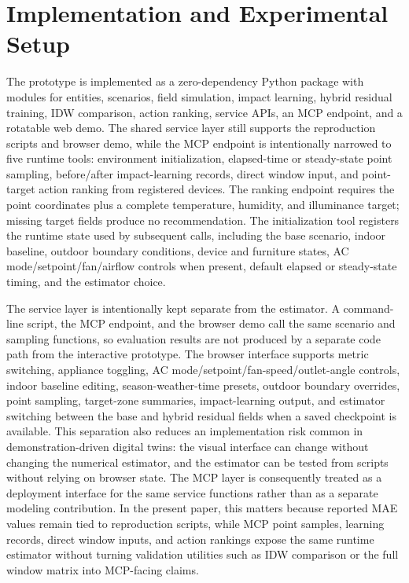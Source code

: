 \documentclass[conference,a4paper]{IEEEtran}
\begin{document}
\section{Implementation and Experimental Setup}
The prototype is implemented as a zero-dependency Python package with modules for entities, scenarios, field simulation, impact learning, hybrid residual training, IDW comparison, action ranking, service APIs, an MCP endpoint, and a rotatable web demo. The shared service layer still supports the reproduction scripts and browser demo, while the MCP endpoint is intentionally narrowed to five runtime tools: environment initialization, elapsed-time or steady-state point sampling, before/after impact-learning records, direct window input, and point-target action ranking from registered devices. The ranking endpoint requires the point coordinates plus a complete temperature, humidity, and illuminance target; missing target fields produce no recommendation. The initialization tool registers the runtime state used by subsequent calls, including the base scenario, indoor baseline, outdoor boundary conditions, device and furniture states, AC mode/setpoint/fan/airflow controls when present, default elapsed or steady-state timing, and the estimator choice.

The service layer is intentionally kept separate from the estimator. A command-line script, the MCP endpoint, and the browser demo call the same scenario and sampling functions, so evaluation results are not produced by a separate code path from the interactive prototype. The browser interface supports metric switching, appliance toggling, AC mode/setpoint/fan-speed/outlet-angle controls, indoor baseline editing, season-weather-time presets, outdoor boundary overrides, point sampling, target-zone summaries, impact-learning output, and estimator switching between the base and hybrid residual fields when a saved checkpoint is available.
This separation also reduces an implementation risk common in demonstration-driven digital twins: the visual interface can change without changing the numerical estimator, and the estimator can be tested from scripts without relying on browser state. The MCP layer is consequently treated as a deployment interface for the same service functions rather than as a separate modeling contribution. In the present paper, this matters because reported MAE values remain tied to reproduction scripts, while MCP point samples, learning records, direct window inputs, and action rankings expose the same runtime estimator without turning validation utilities such as IDW comparison or the full window matrix into MCP-facing claims.
\end{document}
